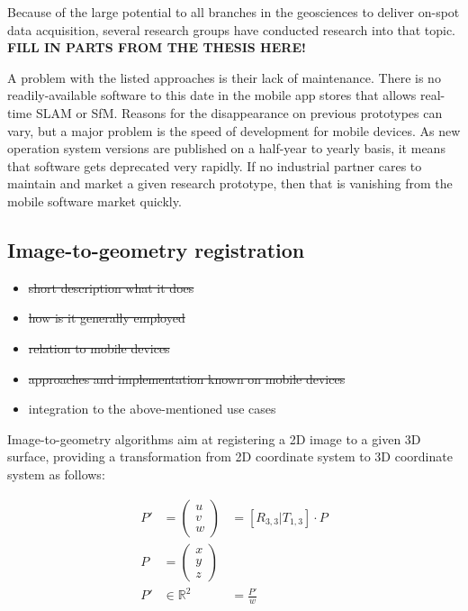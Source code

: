 \documentclass[review]{elsarticle}
\begin{document}
Because of the large potential to all branches in the geosciences to deliver on-spot data acquisition, several research groups have conducted research into that topic. \textbf{FILL IN PARTS FROM THE THESIS HERE!}

A problem with the listed approaches is their lack of maintenance. There is no readily-available software to this date in the mobile app stores that allows real-time SLAM or SfM. Reasons for the disappearance on previous prototypes can vary, but a major problem is the speed of development for mobile devices. As new operation system versions are published on a half-year to yearly basis, it means that software gets deprecated very rapidly. If no industrial partner cares to maintain and market a given research prototype, then that is vanishing from the mobile software market quickly.

\subsection{Image-to-geometry registration}

\begin{itemize}
\item \sout{short description what it does}
\item \sout{how is it generally employed}
\item \sout{relation to mobile devices}
\item \sout{approaches and implementation known on mobile devices}
\item integration to the above-mentioned use cases
\end{itemize}

Image-to-geometry algorithms aim at registering a 2D image to a given 3D surface, providing a transformation from 2D coordinate system to 3D coordinate system as follows:

\begin{eqnarray}
P' &= \begin{pmatrix}
u \\ v \\ w
\end{pmatrix} &= [ R_{3,3} | T_{1,3} ] \cdot P \\
P &= \begin{pmatrix}
x \\ y \\ z
\end{pmatrix} & \\
P' &\in \mathds{R}^2 &= \frac{P'}{w}
\end{eqnarray}
\end{document}
